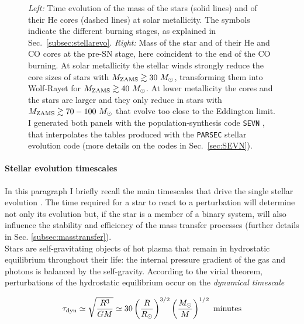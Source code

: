 \documentclass[a4paper,titlepage]{book}     	%
\newcommand{\sun}{\ensuremath{_\odot}}
\newcommand{\mzams}{M_\textup{ZAMS}}
\newcommand{\msun}{\ensuremath{M\sun}}
\begin{document}
\begin{figure}[h!]
\begin{minipage}{.49\textwidth}
	\end{minipage}
	\caption{\emph{Left:} Time evolution of the mass of the stars (solid lines) and of their He cores (dashed lines) at solar metallicity. The symbols indicate the different burning stages, as explained in Sec.\ \ref{subsec:stellarevo}. \emph{Right:} Mass of the star and of their He and CO cores at the pre-SN stage, here coincident to the end of the CO burning. At solar metallicity the stellar winds strongly reduce the core sizes of stars with $\mzams \gtrsim 30 ~\msun$, transforming them into Wolf-Rayet for $\mzams \gtrsim 40 ~\msun$. At lower metallicity the cores and the stars are larger and they only reduce in stars with $\mzams \gtrsim 70-100 ~\msun$ that evolve too close to the Eddington limit. I generated both panels with the population-synthesis code \texttt{SEVN} \cite{spera2019_mergingBBH}, that interpolates the tables produced with the \texttt{PARSEC} stellar evolution code \cite{parsec2015_chen} (more details on the codes in Sec.\ \ref{sec:SEVN}).}\label{fig:masslostWR}
\end{figure}



\paragraph{Stellar evolution timescales} In this paragraph I briefly recall the main timescales that drive the single stellar evolution \cite{evostellare}. The time required for a star to react to a perturbation will determine not only its evolution but, if the star is a member of a binary system, will also influence the stability and efficiency of the mass transfer processes (further details in Sec. \ref{subsec:masstransfer}). \\

Stars are self-gravitating objects of hot plasma that remain in hydrostatic equilibrium throughout their life: the internal pressure gradient of the gas and photons is balanced by the self-gravity. According to the virial theorem, perturbations of the hydrostatic equilibrium occur on the \emph{dynamical timescale}

\begin{equation}\label{eq:taudyn}
\tau_\textup{dyn} \simeq \sqrt{\frac{R^3}{G M}} \simeq 30 \left(\frac{R}{R\sun}\right)^{3/2} \left(\frac{M\sun}{M}\right)^{1/2}\ \text{minutes}
\end{equation}
\end{document}
